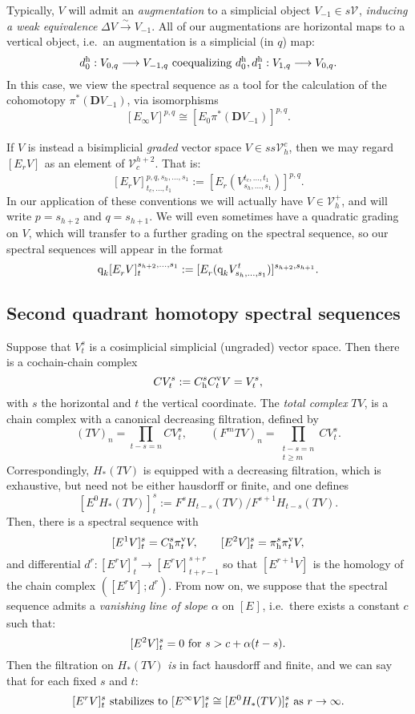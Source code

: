 \documentclass[11pt]{amsart}
\theoremstyle{plain}
\theoremstyle{definition}
\renewcommand{\to}{\longrightarrow}
\newcommand{\calV}{\mathcal{V}}
\theoremstyle{plain}
\newcommand{\vect}[2]{\calV^{#1}_{#2}}
\newcommand{\quadgrad}[1]{\textup{q}_{#1}}
\newcommand{\E}[5]{[E^{#1}_{#2}#3]^{#4}_{#5}}
\newcommand{\uver}{^\textup{v}}
\newcommand{\uhor}{^\textup{h}}
\newcommand{\dhor}{_\textup{h}}
\newcommand{\diag}{\Delta}
\newcommand{\dual}{\mathbf{D}}
\begin{document}
\begin{Conventions and notation}
Typically, $V$ will admit an \emph{augmentation} to a simplicial object $V_{-1}\in s\vect{}{}$, \emph{inducing a weak equivalence} $\diag V\overset{\sim}{\to}V_{-1}$. All of our  augmentations are horizontal maps to a vertical object, i.e.\ an augmentation is a simplicial (in $q$) map:
\[d\uhor_0:V_{0,q}\to V_{-1,q}\textup{ coequalizing }d\uhor_0,d\uhor_1:V_{1,q}\to V_{0,q}.\]
In this case, we view the spectral sequence as a tool for the calculation of the cohomotopy $\pi^*(\dual V_{-1})$, via isomorphisms
\[\E{}{\infty}{V}{p,q}{}\cong \E{}{0}{\pi^*(\dual V_{-1})}{p,q}{}.\]


If $V$ is instead a bisimplicial \emph{graded} vector space $V\in ss\vect{c}{h}$, then we may regard $\E{}{r}{V}{}{}$ as an element of $\vect{h+2}{c}$. That is:
\[\E{}{r}{V}{p,q,s_h,\ldots,s_1}{t_c,\ldots,t_1}:=\E{}{r}{(V^{t_c,\ldots,t_1}_{s_h,\ldots,s_1})}{p,q}{}.\]
In our application of these conventions we will actually have $V\in \vect{+}{h}$, and will write $p=s_{h+2}$ and $q=s_{h+1}$. We will even sometimes have a quadratic grading on $V$, which will transfer to a further grading on the spectral sequence, so our spectral sequences will appear in the format
\[\quadgrad{k}\E{}{r}{V}{s_{h+2},\ldots,s_1}{t}:=\E{}{r}{(\quadgrad{k}V^{t}_{s_h,\ldots,s_1})}{s_{h+2},s_{h+1}}{}.\]

\subsection{Second quadrant homotopy spectral sequences}\label{Second quadrant homotopy spectral sequences}
Suppose that $V^{s}_{t}$ is a cosimplicial simplicial (ungraded) vector space. Then there is a cochain-chain complex 
\[CV^{s}_{t}:=C\dhor^{s}C\uver_{t}V=V^{s}_{t},\]
with $s$ the horizontal and $t$ the vertical coordinate. The \emph{total complex} $TV$, is a chain complex with a canonical decreasing filtration, defined by 
\[(TV)_n=\prod_{t-s=n}CV^{s}_{t},\qquad(F^mTV)_n=\prod_{\substack{t-s=n\\t\geq m}}CV^{s}_{t}.\]
Correspondingly, $H_*( TV)$ is equipped with a decreasing filtration, which is exhaustive, but need not be either hausdorff or finite, and one defines
\[\E{0}{}{H_*( TV)}{s}{t}:=F^{s}H_{t-s}( TV)/F^{s+1}   H_{t-s}( TV).\]
Then, there is a spectral sequence with
\[\E{1}{}{V}{s}{t}=C\dhor^{s}\pi\uver_{t}V,\qquad\E{2}{}{V}{s}{t}=\pi\dhor^{s}\pi\uver_{t}V,\]
and differential $d^r:\E{r}{}{V}{s}{t}\to \E{r}{}{V}{s+r}{t+r-1}$ so that $\E{r+1}{}{V}{}{}$ is the homology of the chain complex $(\E{r}{}{V}{}{};d^r)$. From now on, we suppose that the spectral sequence admits a \emph{vanishing line of slope $\alpha$} on $\E{}{}{}{}{}$, i.e.\ there exists a constant $c$ such that:
\[\E{2}{}{V}{s}{t}=0\textup{ for }s>c+\alpha(t-s).\]
Then the filtration on $H_*( TV)$ \emph{is} in fact hausdorff and finite, and we can say that for each fixed $s$ and $t$:
\[\E{r}{}{V}{s}{t}\textup{ stabilizes to }\E{\infty}{}{V}{s}{t}\cong \E{0}{}{H_*( TV)}{s}{t}\textup{ as $r\rightarrow\infty$}.\]




\end{Conventions and notation}
\end{document}
